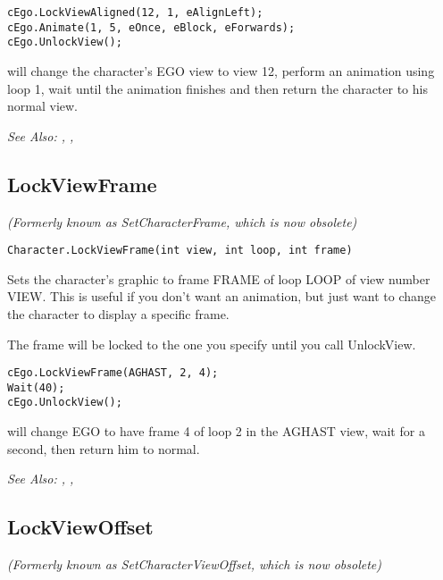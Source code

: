 \begin{verbatim}
cEgo.LockViewAligned(12, 1, eAlignLeft);
cEgo.Animate(1, 5, eOnce, eBlock, eForwards);
cEgo.UnlockView();
\end{verbatim}
will change the character's EGO view to view 12, perform an animation using loop 1,
wait until the animation finishes and then return the character to his normal view.

\it{See Also:} ,
,


\subsection{LockViewFrame}\label{Character.LockViewFrame}%

\it{(Formerly known as SetCharacterFrame, which is now obsolete)}

\begin{verbatim}
Character.LockViewFrame(int view, int loop, int frame)
\end{verbatim}
Sets the character's graphic to frame FRAME of loop LOOP of view number VIEW.
This is useful if you don't want an animation, but just want to change the
character to display a specific frame.

The frame will be locked to the one you specify until you call UnlockView.

\begin{verbatim}
cEgo.LockViewFrame(AGHAST, 2, 4);
Wait(40);
cEgo.UnlockView();
\end{verbatim}
will change EGO to have frame 4 of loop 2 in the AGHAST view, wait for a second,
then return him to normal.

\it{See Also:} ,
,


\subsection{LockViewOffset}\label{Character.LockViewOffset}%

\it{(Formerly known as SetCharacterViewOffset, which is now obsolete)}

